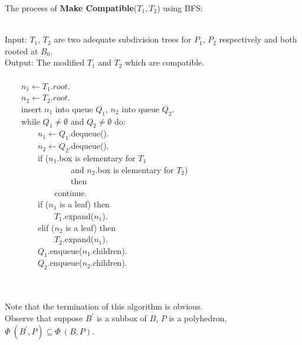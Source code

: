 \documentclass[twoside]{article}
\begin{document}
\begin{multicols}{2}
The process of \textbf{Make Compatible}($T_1,T_2$) using BFS:
\\
\\
\begin{boxedminipage}{.47\textwidth}

Input: $T_1$, $T_2$ are two adequate subdivision trees for $P_1$, $P_2$ respectively and both rooted at $B_0$.
\\
Output: The modified $T_1$ and $T_2$ which are compatible.
\\
\\ \indent \ \ \ \ 
$n_1 \leftarrow T_1.root$.
\\ \indent \ \ \ \ 
$n_2 \leftarrow T_2.root$.
\\ \indent \ \ \ \ 
insert $n_1$ into queue $Q_1$, $n_2$ into queue $Q_2$.
\\ \indent \ \ \ \ 
while $Q_1 \neq \emptyset$ and $Q_2 \neq \emptyset$ do:
\\ \indent \ \ \ \ \ \ \ \ 
$n_1 \leftarrow Q_1$.dequeue().
\\ \indent \ \ \ \ \ \ \ \ 
$n_2 \leftarrow Q_2$.dequeue().
\\ \indent \ \ \ \ \ \ \ \ 
if ($n_1$.box is elementary for $T_1$
\\ \indent \ \ \ \ \ \ \ \ \ \ \ \ \ \ \ \ 
and $n_2$.box is elementary for $T_2$)
\\ \indent \ \ \ \ \ \ \ \ \ \ \ \ \ \ \ \ 
then
\\ \indent \ \ \ \ \ \ \ \ \ \ \ \ 
continue.
\\ \indent \ \ \ \ \ \ \ \ 
if ($n_1$ is a leaf) then
\\ \indent \ \ \ \ \ \ \ \ \ \ \ \ 
$T_1$.expand($n_1$).
\\ \indent \ \ \ \ \ \ \ \ 
elif ($n_2$ is a leaf) then
\\ \indent \ \ \ \ \ \ \ \ \ \ \ \ 
$T_2$.expand($n_1$).
\\ \indent \ \ \ \ \ \ \ \ 
$Q_1$.enqueue($n_1$.children).
\\ \indent \ \ \ \ \ \ \ \ 
$Q_2$.enqueue($n_2$.children).
\end{boxedminipage}
\\
\\
\indent
Note that the termination of this algorithm is obvious.
\\
Observe that suppose $B^\prime$ is a subbox of $B$, $P$ is a polyhedron, $\Phi\ (B^\prime, P) \subseteq \Phi\ (B, P)$.
\newtheorem{lemma}{Lemma}

\end{multicols}
\end{document}
